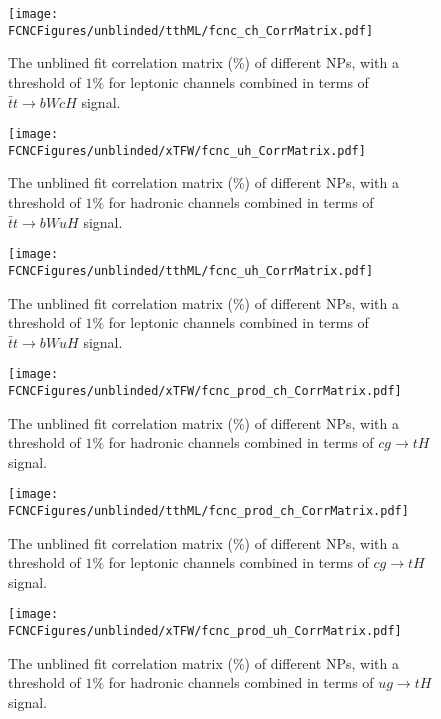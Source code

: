 \begin{figure}[H]
\centering
\texttt{[image: \\FCNCFigures/unblinded/tthML/fcnc\_ch\_CorrMatrix.pdf]}
\caption{ The unblined fit correlation matrix ($\%$) of different NPs, with a threshold of $1\%$ for  leptonic channels combined in terms of $\bar{t}t\to bWcH$ signal. }
\label{fig:fcnc_ch_CorrMatrix_2}
\end{figure}


\begin{figure}[H]
\centering
\texttt{[image: \\FCNCFigures/unblinded/xTFW/fcnc\_uh\_CorrMatrix.pdf]}
\caption{ The unblined fit correlation matrix ($\%$) of different NPs, with a threshold of $1\%$ for hadronic channels combined in terms of $\bar{t}t\to bWuH$ signal.}
\label{fig:fcnc_uh_CorrMatrix_1}
\end{figure}



\begin{figure}[H]
\centering
\texttt{[image: \\FCNCFigures/unblinded/tthML/fcnc\_uh\_CorrMatrix.pdf]}
\caption{ The unblined fit correlation matrix ($\%$) of different NPs, with a threshold of $1\%$ for  leptonic channels combined in terms of $\bar{t}t\to bWuH$ signal.}
\label{fig:fcnc_uh_CorrMatrix_2}
\end{figure}



\begin{figure}[H]
\centering
\texttt{[image: \\FCNCFigures/unblinded/xTFW/fcnc\_prod\_ch\_CorrMatrix.pdf]}
\caption{ The unblined fit correlation matrix ($\%$) of different NPs, with a threshold of $1\%$ for hadronic channels combined in terms of $cg\to tH$ signal.}
\label{fig:fcnc_prod_ch_CorrMatrix_1}
\end{figure}



\begin{figure}[H]
\centering
\texttt{[image: \\FCNCFigures/unblinded/tthML/fcnc\_prod\_ch\_CorrMatrix.pdf]}
\caption{ The unblined fit correlation matrix ($\%$) of different NPs, with a threshold of $1\%$ for leptonic channels combined in terms of $cg\to tH$ signal.}
\label{fig:fcnc_prod_ch_CorrMatrix_2}
\end{figure}

\begin{figure}[H]
\centering
\texttt{[image: \\FCNCFigures/unblinded/xTFW/fcnc\_prod\_uh\_CorrMatrix.pdf]}
\caption{ The unblined fit correlation matrix ($\%$) of different NPs, with a threshold of $1\%$ for hadronic channels combined in terms of $ug\to tH$ signal.}
\label{fig:fcnc_prod_uh_CorrMatrix_1}
\end{figure}

